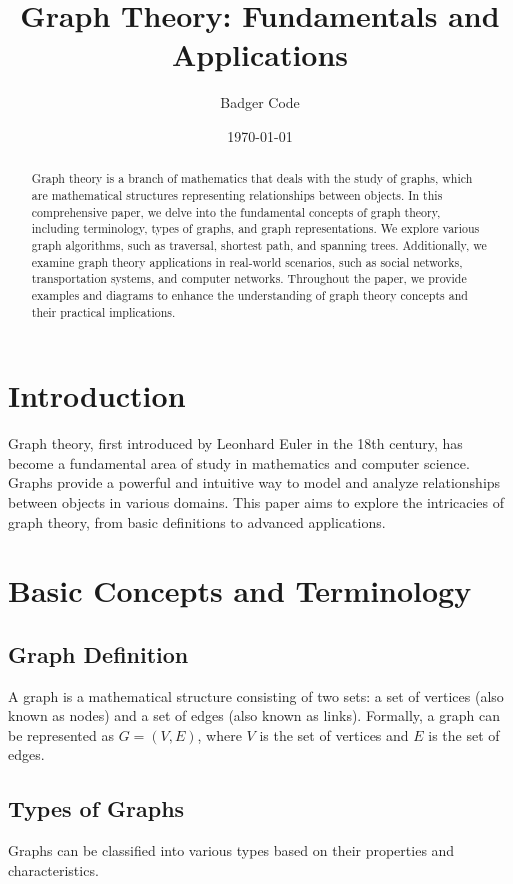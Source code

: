 \documentclass{article}
\title{Graph Theory: Fundamentals and Applications}
\author{Badger Code}
\date{\today}
\begin{document}
\maketitle

\begin{abstract}
Graph theory is a branch of mathematics that deals with the study of graphs, which are mathematical structures representing relationships between objects. In this comprehensive paper, we delve into the fundamental concepts of graph theory, including terminology, types of graphs, and graph representations. We explore various graph algorithms, such as traversal, shortest path, and spanning trees. Additionally, we examine graph theory applications in real-world scenarios, such as social networks, transportation systems, and computer networks. Throughout the paper, we provide examples and diagrams to enhance the understanding of graph theory concepts and their practical implications.
\end{abstract}

\section{Introduction}
Graph theory, first introduced by Leonhard Euler in the 18th century, has become a fundamental area of study in mathematics and computer science. Graphs provide a powerful and intuitive way to model and analyze relationships between objects in various domains. This paper aims to explore the intricacies of graph theory, from basic definitions to advanced applications.

\section{Basic Concepts and Terminology}
\subsection{Graph Definition}
A graph is a mathematical structure consisting of two sets: a set of vertices (also known as nodes) and a set of edges (also known as links). Formally, a graph can be represented as $G = (V, E)$, where $V$ is the set of vertices and $E$ is the set of edges.

\subsection{Types of Graphs}
Graphs can be classified into various types based on their properties and characteristics.
\end{document}
